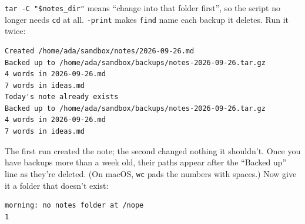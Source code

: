 \begin{codeblock}
\begin{Shaded}
\begin{Highlighting}[]
 \NormalTok{/}\PreprocessorTok{*}\KeywordTok{;} 
   \VariableTok{$(}  \OperatorTok{\textless{}} \VariableTok{)}\VariableTok{$(} \VariableTok{)}
\end{Highlighting}
\end{Shaded}

\end{codeblock}


\texttt{tar\ -C\ "\$notes\_dir"} means ``change into that folder first'', so the script no longer needs \texttt{cd} at all. \texttt{-print} makes \texttt{find} name each backup it deletes. Run it twice:

\begin{codeblock}
\begin{Verbatim}[formatcom=\outputstyle]
Created /home/ada/sandbox/notes/2026-09-26.md
Backed up to /home/ada/sandbox/backups/notes-2026-09-26.tar.gz
4 words in 2026-09-26.md
7 words in ideas.md
Today's note already exists
Backed up to /home/ada/sandbox/backups/notes-2026-09-26.tar.gz
4 words in 2026-09-26.md
7 words in ideas.md
\end{Verbatim}
\end{codeblock}

The first run created the note; the second changed nothing it shouldn't. Once you have backups more than a week old, their paths appear after the ``Backed up'' line as they're deleted. (On macOS, \texttt{wc} pads the numbers with spaces.) Now give it a folder that doesn't exist:

\begin{codeblock}

\begin{Shaded}
\begin{Highlighting}[]
 
\end{Highlighting}
\end{Shaded}

\end{codeblock}

\begin{codeblock}
\begin{Verbatim}[formatcom=\outputstyle]
morning: no notes folder at /nope
1
\end{Verbatim}
\end{codeblock}

